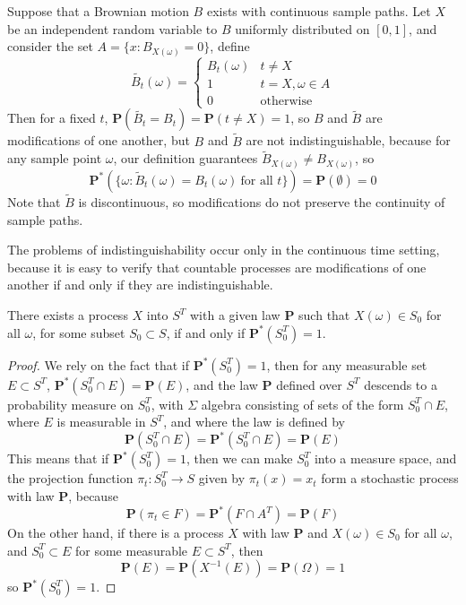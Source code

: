 \begin{example}
    Suppose that a Brownian motion $B$ exists with continuous sample paths. Let $X$ be an independent random variable to $B$ uniformly distributed on $[0,1]$, and consider the set $A = \{ x : B_{X(\omega)} = 0 \}$, define
    \[ \tilde{B_t}(\omega) = \begin{cases} B_t(\omega) & t \neq X \\ 1 & t = X, \omega \in A \\ 0 & \text{otherwise} \end{cases} \]
    Then for a fixed $t$, $\mathbf{P}(\tilde{B_t} = B_t) = \mathbf{P}(t \neq X) = 1$, so $B$ and $\tilde{B}$ are modifications of one another, but $B$ and $\tilde{B}$ are not indistinguishable, because for any sample point $\omega$, our definition guarantees $\tilde{B}_{X(\omega)} \neq B_{X(\omega)}$, so
    \[ \mathbf{P}^*(\{ \omega: \tilde{B}_t(\omega) = B_t(\omega)\ \text{for all $t$} \}) = \mathbf{P}(\emptyset) = 0 \]
    Note that $\tilde{B}$ is discontinuous, so modifications do not preserve the continuity of sample paths.
\end{example}

The problems of indistinguishability occur only in the continuous time setting, because it is easy to verify that countable processes are modifications of one another if and only if they are indistinguishable.

\begin{lemma}
    There exists a process $X$ into $S^T$ with a given law $\mathbf{P}$ such that $X(\omega) \in S_0$ for all $\omega$, for some subset $S_0 \subset S$, if and only if $\mathbf{P}^*(S_0^T) = 1$.
\end{lemma}
\begin{proof}
    We rely on the fact that if $\mathbf{P}^*(S_0^T) = 1$, then for any measurable set $E \subset S^T$, $\mathbf{P}^*(S_0^T \cap E) = \mathbf{P}(E)$, and the law $\mathbf{P}$ defined over $S^T$ descends to a probability measure on $S_0^T$, with $\Sigma$ algebra consisting of sets of the form $S_0^T \cap E$, where $E$ is measurable in $S^T$, and where the law is defined by
    \[ \mathbf{P}(S_0^T \cap E) = \mathbf{P}^*(S_0^T \cap E) = \mathbf{P}(E) \]
    This means that if $\mathbf{P}^*(S_0^T) = 1$, then we can make $S_0^T$ into a measure space, and the projection function $\pi_t: S_0^T \to S$ given by $\pi_t(x) = x_t$ form a stochastic process with law $\mathbf{P}$, because
    \[ \mathbf{P}(\pi_t \in F) = \mathbf{P}^*(F \cap A^T) = \mathbf{P}(F) \]
    On the other hand, if there is a process $X$ with law $\mathbf{P}$ and $X(\omega) \in S_0$ for all $\omega$, and $S_0^T \subset E$ for some measurable $E \subset S^T$, then
    \[ \mathbf{P}(E) = \mathbf{P}(X^{-1}(E)) = \mathbf{P}(\Omega) = 1 \]
    so $\mathbf{P}^*(S_0^T) = 1$.
\end{proof}

